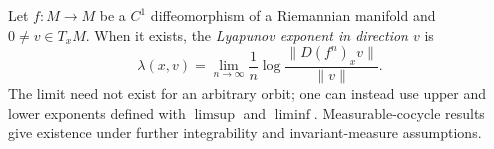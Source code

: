 
Let $f:M\to M$ be a $C^1$ diffeomorphism of a Riemannian manifold and $0\ne v\in T_xM$. When it exists, the \emph{Lyapunov exponent in direction $v$} is
\[
\lambda(x,v)=\lim_{n\to\infty}\frac1n\log\frac{\|D(f^n)_xv\|}{\|v\|}.
\]
The limit need not exist for an arbitrary orbit; one can instead use upper and lower exponents defined with $\limsup$ and $\liminf$. Measurable-cocycle results give existence under further integrability and invariant-measure assumptions.
